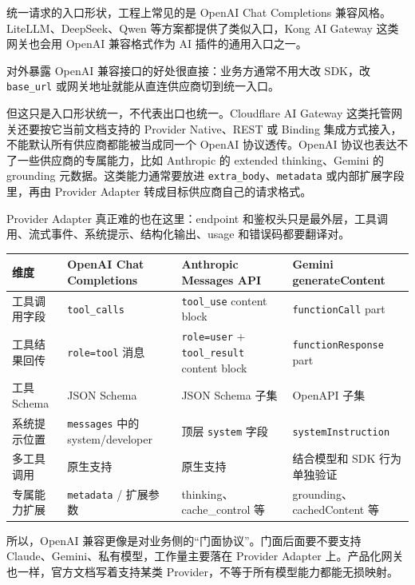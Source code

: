 \documentclass[10pt,a4paper]{ctexart}
\begin{document}
统一请求的入口形状，工程上常见的是 OpenAI Chat Completions 兼容风格。LiteLLM、DeepSeek、Qwen 等方案都提供了类似入口，Kong AI Gateway 这类网关也会用 OpenAI 兼容格式作为 AI 插件的通用入口之一。



对外暴露 OpenAI 兼容接口的好处很直接：业务方通常不用大改 SDK，改 \texttt{base\_url} 或网关地址就能从直连供应商切到统一入口。



但这只是入口形状统一，不代表出口也统一。Cloudflare AI Gateway 这类托管网关还要按它当前文档支持的 Provider Native、REST 或 Binding 集成方式接入，不能默认所有供应商都能被当成同一个 OpenAI 协议透传。OpenAI 协议也表达不了一些供应商的专属能力，比如 Anthropic 的 extended thinking、Gemini 的 grounding 元数据。这类能力通常要放进 \texttt{extra\_body}、\texttt{metadata} 或内部扩展字段里，再由 Provider Adapter 转成目标供应商自己的请求格式。



Provider Adapter 真正难的也在这里：endpoint 和鉴权头只是最外层，工具调用、流式事件、系统提示、结构化输出、usage 和错误码都要翻译对。


{\footnotesize
\begin{tabularx}{\textwidth}{|X|X|X|X|}
\hline
\textbf{维度} & \textbf{OpenAI Chat Completions} & \textbf{Anthropic Messages API} & \textbf{Gemini generateContent} \\
\hline
工具调用字段 & \texttt{tool\_calls} & \texttt{tool\_use} content block & \texttt{functionCall} part \\
\hline
工具结果回传 & \texttt{role=tool} 消息 & \texttt{role=user} + \texttt{tool\_result} content block & \texttt{functionResponse} part \\
\hline
工具 Schema & JSON Schema & JSON Schema 子集 & OpenAPI 子集 \\
\hline
系统提示位置 & \texttt{messages} 中的 system/developer & 顶层 \texttt{system} 字段 & \texttt{systemInstruction} \\
\hline
多工具调用 & 原生支持 & 原生支持 & 结合模型和 SDK 行为单独验证 \\
\hline
专属能力扩展 & \texttt{metadata} / 扩展参数 & thinking、cache\_control 等 & grounding、cachedContent 等 \\
\hline
\end{tabularx}
}



所以，OpenAI 兼容更像是对业务侧的“门面协议”。门面后面要不要支持 Claude、Gemini、私有模型，工作量主要落在 Provider Adapter 上。产品化网关也一样，官方文档写着支持某类 Provider，不等于所有模型能力都能无损映射。
\end{document}
